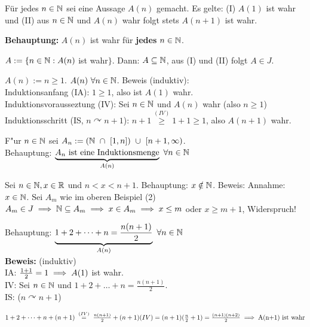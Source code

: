 \documentclass[a4paper,twoside,DIV15,BCOR12mm]{scrbook}
\begin{document}
\begin{satz}

Für jedes $n \in \mathbb{N}$ sei eine Aussage $A(n)$ gemacht. Es gelte: (I) $A(1)$ ist wahr und (II) aus $n \in \mathbb{N}$ und $A(n)$ wahr folgt stets $A(n+1)$ ist wahr.

\textbf{Behauptung:} $A(n)$ ist wahr für \textbf{jedes} $n \in \mathbb{N}$.
\end{satz}

\begin{beweis} $A := \{ n \in \mathbb{N}: A(n)$ ist wahr$\}$. Dann: $A \subseteq \mathbb{N}$, aus (I) und (II) folgt $A \in J$.
\end{beweis}

\begin{beispiele}
\item $A(n) := n \ge 1$. $A(n)\ \forall n \in \mathbb{N}$. Beweis (induktiv):\\
Induktionsanfang (IA): $1 \ge 1$, also ist $A(1)$ wahr. \\
Induktionsvorausseztung (IV): Sei $n \in \mathbb{N}$ und $A(n)$ wahr (also $n \ge 1$) \\
Induktionsschritt (IS, $n \curvearrowright n + 1$): $n+1 
\stackrel{(IV)}{\ge} 1 + 1 \ge 1$, also $A(n+1)$ wahr.
\item F"ur $n \in \mathbb{N}$ sei $A_n:=(\mathbb{N}\ \cap\ [1,n])\ \cup\ [n+1, \infty)$. \\
Behauptung: $\underbrace{A_n \text{ ist eine Induktionsmenge}}_{A(n)} \ \forall n \in \mathbb{N}$
\item Sei $n \in \mathbb{N}, x \in \mathbb{R}$ und $n<x<n+1$. Behauptung: $x \notin \mathbb{N}$. Beweis: Annahme: $x \in \mathbb{N}$. Sei $A_m$ wie im oberen Beispiel (2) \folgt $A_m \in J \implies \mathbb{N} \subseteq A_m \implies x \in A_m \implies x \le m$ oder $x\ge m+1$, Widerspruch!
\item 
Behauptung: $\underbrace{1+2+\dots +n = \frac{n(n+1)}{2}}_{A(n)}\ \forall n\in \mathbb{N}$\\
\textbf{Beweis:} (induktiv)\\
IA: $\frac{1+1}{2}=1 \implies A(1)$ ist wahr.\\
IV: Sei $n\in \mathbb{N}$ und $1+2+\dots +n = \frac{n(n+1)}{2}$.\\
IS: ($n \curvearrowright  n+1$)

$1+2+\dots +n+(n+1)
 \gleichwegen{(IV)} \frac{n(n+1)}{2} + (n+1) (IV)
 = (n+1)(\frac{n}{2}+1)
 = \frac{(n+1)(n+2)}{2}
\folgt \text{A(n+1) ist wahr}$
\end{beispiele}
\end{document}
